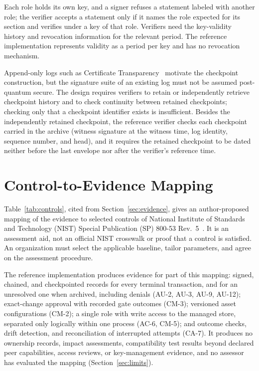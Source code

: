 \documentclass[journal]{IEEEtran}
\begin{document}
Each role holds its own key, and a signer refuses a statement labeled with another role; the verifier accepts a statement only if it names the role expected for its section and verifies under a key of that role. Verifiers need the key-validity history and revocation information for the relevant period. The reference implementation represents validity as a period per key and has no revocation mechanism.

Append-only logs such as Certificate Transparency~\cite{ct} motivate the checkpoint construction, but the signature suite of an existing log must not be assumed post-quantum secure. The design requires verifiers to retain or independently retrieve checkpoint history and to check continuity between retained checkpoints; checking only that a checkpoint identifier exists is insufficient. Besides the independently retained checkpoint, the reference verifier checks each checkpoint carried in the archive (witness signature at the witness time, log identity, sequence number, and head), and it requires the retained checkpoint to be dated neither before the last envelope nor after the verifier's reference time.

\section{Control-to-Evidence Mapping}
\label{s:controls}
Table~\ref{tab:controls}, cited from Section~\ref{sec:evidence}, gives an author-proposed mapping of the evidence to selected controls of National Institute of Standards and Technology (NIST) Special Publication (SP) 800-53 Rev.~5~\cite{sp80053}. It is an assessment aid, not an official NIST crosswalk or proof that a control is satisfied. An organization must select the applicable baseline, tailor parameters, and agree on the assessment procedure.

The reference implementation produces evidence for part of this mapping: signed, chained, and checkpointed records for every terminal transaction, and for an unresolved one when archived, including denials (AU-2, AU-3, AU-9, AU-12); exact-change approval with recorded gate outcomes (CM-3); versioned asset configurations (CM-2); a single role with write access to the managed store, separated only logically within one process (AC-6, CM-5); and outcome checks, drift detection, and reconciliation of interrupted attempts (CA-7). It produces no ownership records, impact assessments, compatibility test results beyond declared peer capabilities, access reviews, or key-management evidence, and no assessor has evaluated the mapping (Section~\ref{sec:limits}).
\end{document}
